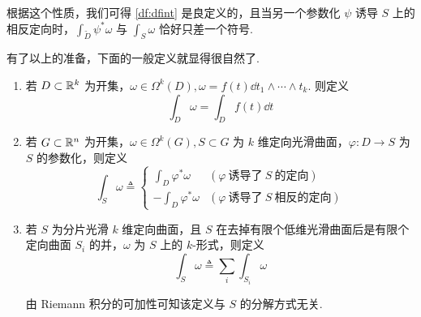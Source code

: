根据这个性质，我们可得 \ref{df:dfint} 是良定义的，且当另一个参数化 $\psi$ 诱导 $S$ 上的相反定向时，$\displaystyle\int_{\widetilde{D}}\psi^*\omega$ 与 $\displaystyle\int_S\omega$ 恰好只差一个符号.


有了以上的准备，下面的一般定义就显得很自然了.

\begin{definition}
    \begin{enumerate}
        \item 若 $D\subset\mathbb{R}^k$ 为开集，$\omega\in\Omega^k(D),\omega=f(t)\dd t_1\wedge\cdots\wedge t_k$. 则定义
$$
\int_D\omega=\int_Df(t)\dd t
$$

        \item 若 $G\subset\mathbb{R}^n$ 为开集，$\omega\in\Omega^k(G),S\subset G$ 为 $k$ 维定向光滑曲面，$\varphi:D\to S$ 为 $S$ 的参数化，则定义
$$
\int_S\omega\triangleq\begin{cases}
    \displaystyle\int_D\varphi^*\omega & (\varphi~\text{诱导了}~S~\text{的定向})\\
    \displaystyle-\int_D\varphi^*\omega & (\varphi~\text{诱导了}~S~\text{相反的定向})
\end{cases}
$$

        \item 若 $S$ 为分片光滑 $k$ 维定向曲面，且 $S$ 在去掉有限个低维光滑曲面后是有限个定向曲面 $S_i$ 的并，$\omega$ 为 $S$ 上的 $k$-形式，则定义
$$
\int_S\omega\triangleq\sum_i\int_{S_i}\omega
$$

        由 Riemann 积分的可加性可知该定义与 $S$ 的分解方式无关.
    \end{enumerate}
\end{definition}